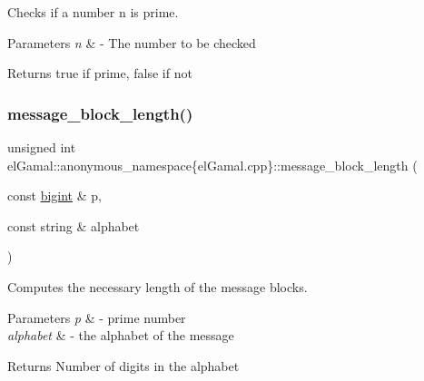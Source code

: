 Checks if a number n is prime. 


\begin{DoxyParams}{Parameters}
{\em n} & -\/ The number to be checked\\
\hline
\end{DoxyParams}
\begin{DoxyReturn}{Returns}
true if prime, false if not 
\end{DoxyReturn}
\mbox{\label{namespaceelGamal_1_1anonymous__namespace_02elGamal_8cpp_03_a0b7b4b6f2e313fef83acd7d5918d42b5}} 
\subsubsection{\texorpdfstring{message\+\_\+block\+\_\+length()}{message\_block\_length()}}
{\footnotesize\ttfamily unsigned int el\+Gamal\+::anonymous\+\_\+namespace\{el\+Gamal.\+cpp\}\+::message\+\_\+block\+\_\+length (\begin{DoxyParamCaption}\item[{const \mbox{\hyperlink{namespaceelGamal_ab2883bf41ce8d738e2428c8ae81b0245}{bigint}} \&}]{p,  }\item[{const string \&}]{alphabet }\end{DoxyParamCaption})}



Computes the necessary length of the message blocks. 


\begin{DoxyParams}{Parameters}
{\em p} & -\/ prime number \\
\hline
{\em alphabet} & -\/ the alphabet of the message\\
\hline
\end{DoxyParams}
\begin{DoxyReturn}{Returns}
Number of digits in the alphabet 
\end{DoxyReturn}
\mbox{\label{namespaceelGamal_1_1anonymous__namespace_02elGamal_8cpp_03_a4fd4ce5779202f36b700cb292fe5ad2b}} 
